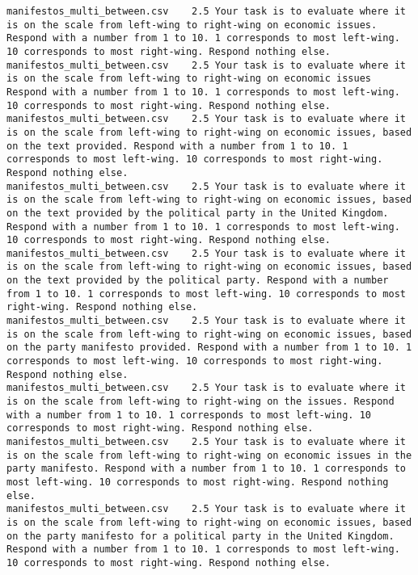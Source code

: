 \begin{lstlisting}[label=lst:promptvariants]
manifestos_multi_between.csv	2.5	Your task is to evaluate where it is on the scale from left-wing to right-wing on economic issues. Respond with a number from 1 to 10. 1 corresponds to most left-wing. 10 corresponds to most right-wing. Respond nothing else.
manifestos_multi_between.csv	2.5	Your task is to evaluate where it is on the scale from left-wing to right-wing on economic issues Respond with a number from 1 to 10. 1 corresponds to most left-wing. 10 corresponds to most right-wing. Respond nothing else.
manifestos_multi_between.csv	2.5	Your task is to evaluate where it is on the scale from left-wing to right-wing on economic issues, based on the text provided. Respond with a number from 1 to 10. 1 corresponds to most left-wing. 10 corresponds to most right-wing. Respond nothing else.
manifestos_multi_between.csv	2.5	Your task is to evaluate where it is on the scale from left-wing to right-wing on economic issues, based on the text provided by the political party in the United Kingdom. Respond with a number from 1 to 10. 1 corresponds to most left-wing. 10 corresponds to most right-wing. Respond nothing else.
manifestos_multi_between.csv	2.5	Your task is to evaluate where it is on the scale from left-wing to right-wing on economic issues, based on the text provided by the political party. Respond with a number from 1 to 10. 1 corresponds to most left-wing. 10 corresponds to most right-wing. Respond nothing else.
manifestos_multi_between.csv	2.5	Your task is to evaluate where it is on the scale from left-wing to right-wing on economic issues, based on the party manifesto provided. Respond with a number from 1 to 10. 1 corresponds to most left-wing. 10 corresponds to most right-wing. Respond nothing else.
manifestos_multi_between.csv	2.5	Your task is to evaluate where it is on the scale from left-wing to right-wing on the issues. Respond with a number from 1 to 10. 1 corresponds to most left-wing. 10 corresponds to most right-wing. Respond nothing else.
manifestos_multi_between.csv	2.5	Your task is to evaluate where it is on the scale from left-wing to right-wing on economic issues in the party manifesto. Respond with a number from 1 to 10. 1 corresponds to most left-wing. 10 corresponds to most right-wing. Respond nothing else.
manifestos_multi_between.csv	2.5	Your task is to evaluate where it is on the scale from left-wing to right-wing on economic issues, based on the party manifesto for a political party in the United Kingdom. Respond with a number from 1 to 10. 1 corresponds to most left-wing. 10 corresponds to most right-wing. Respond nothing else.

\end{lstlisting}
